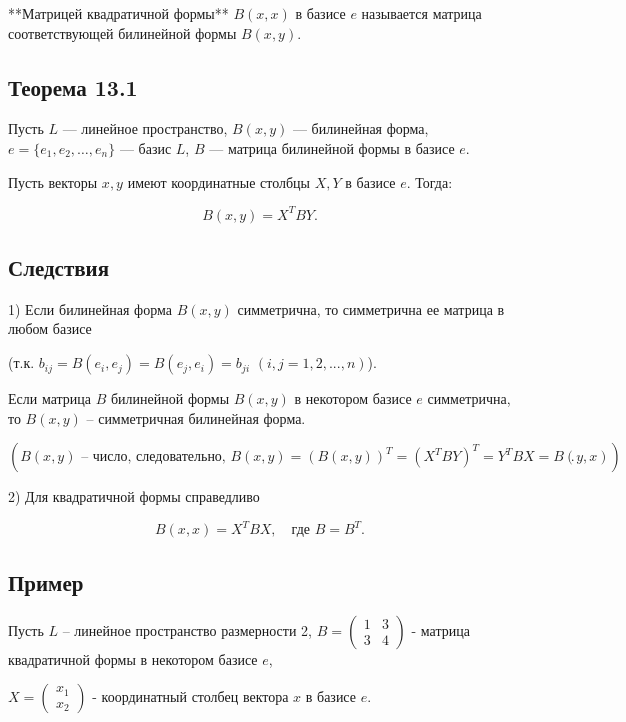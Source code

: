 {**Матрицей квадратичной формы** \( B(x, x) \) в базисе \( e \) называется матрица соответствующей билинейной формы \( B(x, y) \).

\subsection*{Теорема 13.1}

Пусть \( L \) — линейное пространство, \( B(x, y) \) — билинейная форма, \( e = \{e_1, e_2, \dots, e_n\} \) — базис \( L \), \( B \) — матрица билинейной формы в базисе \( e \).

Пусть векторы \( x, y \) имеют координатные столбцы \( X, Y \) в базисе \( e \). Тогда:



\[
B(x, y) = X^T B Y.
\]

\subsection*{Следствия}

1) Если билинейная форма \( B(x, y) \) симметрична, то симметрична ее матрица в любом базисе 

(т.к. \( b_{ij} = B(e_i, e_j) = B(e_j, e_i) = b_{ji} \) \( (i, j = 1, 2, ..., n) \)).

Если матрица \( B \) билинейной формы \( B(x, y) \) в некотором базисе \( e \) симметрична, то \( B(x, y) \) – симметричная билинейная форма.



\[
(B(x, y) \text{ – число, следовательно, } B(x, y) = (B(x, y))^T = (X^TBY)^T = Y^TBX = B(y, x)).
\]



2) Для квадратичной формы справедливо 



\[
B(x, x) = X^TBX, \quad \text{где } B = B^T.
\]



\subsection*{Пример}

Пусть \( L \) – линейное пространство размерности 2, \( B = \begin{pmatrix} 1 & 3 \\ 3 & 4 \end{pmatrix} \) - матрица квадратичной формы в некотором базисе \( e \), 

\( X = \begin{pmatrix} x_1 \\ x_2 \end{pmatrix} \) - координатный столбец вектора \( x \) в базисе \( e \).

}
